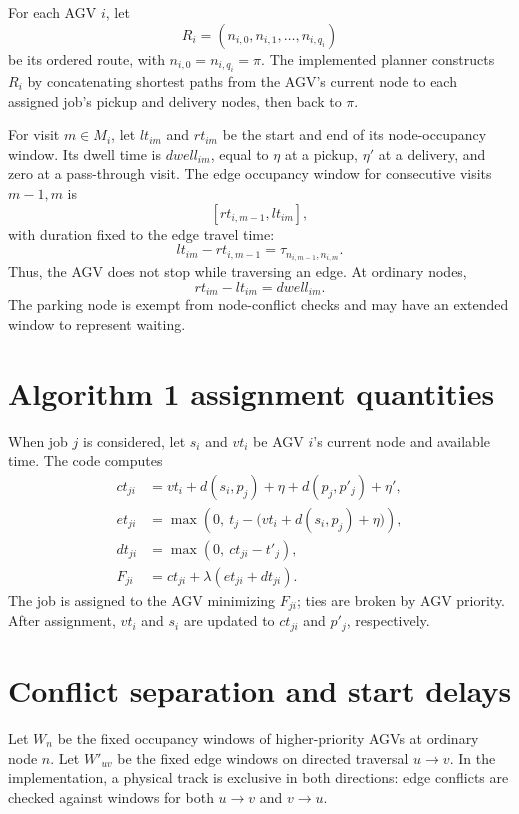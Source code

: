 \documentclass[11pt]{article}
\begin{document}
For each AGV $i$, let
\[
  R_i=(n_{i,0},n_{i,1},\ldots,n_{i,q_i})
\]
be its ordered route, with $n_{i,0}=n_{i,q_i}=\pi$. The implemented planner
constructs $R_i$ by concatenating shortest paths from the AGV's current node
to each assigned job's pickup and delivery nodes, then back to $\pi$.

For visit $m\in M_i$, let $lt_{im}$ and $rt_{im}$ be the start and end of its
node-occupancy window. Its dwell time is $dwell_{im}$, equal to $\eta$ at a
pickup, $\eta'$ at a delivery, and zero at a pass-through visit. The edge
occupancy window for consecutive visits $m-1,m$ is
\[
  [rt_{i,m-1},lt_{im}],
\]
with duration fixed to the edge travel time:
\[
  lt_{im}-rt_{i,m-1}=\tau_{n_{i,m-1},n_{i,m}}.
\]
Thus, the AGV does not stop while traversing an edge. At ordinary nodes,
\[
  rt_{im}-lt_{im}=dwell_{im}.
\]
The parking node is exempt from node-conflict checks and may have an extended
window to represent waiting.

\section{Algorithm 1 assignment quantities}

When job $j$ is considered, let $s_i$ and $vt_i$ be AGV $i$'s current node and
available time. The code computes
\begin{align*}
  ct_{ji}
  &=vt_i+d(s_i,p_j)+\eta+d(p_j,p'_j)+\eta',\\
  et_{ji}
  &=\max\!\left(0,\ t_j-\bigl(vt_i+d(s_i,p_j)+\eta\bigr)\right),\\
  dt_{ji}
  &=\max(0,\ ct_{ji}-t'_j),\\
  F_{ji}
  &=ct_{ji}+\lambda(et_{ji}+dt_{ji}).
\end{align*}
The job is assigned to the AGV minimizing $F_{ji}$; ties are broken by AGV
priority. After assignment, $vt_i$ and $s_i$ are updated to $ct_{ji}$ and
$p'_j$, respectively.

\section{Conflict separation and start delays}

Let $W_n$ be the fixed occupancy windows of higher-priority AGVs at ordinary
node $n$. Let $W'_{uv}$ be the fixed edge windows on directed traversal
$u\to v$. In the implementation, a physical track is exclusive in both
directions: edge conflicts are checked against windows for both $u\to v$ and
$v\to u$.
\end{document}
